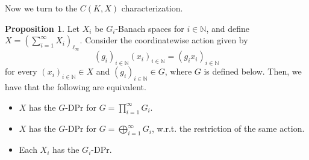 \documentclass[a4paper,12pt]{amsart}
\theoremstyle{definition}
\newtheorem{proposition}[theorem]{Proposition}
\theoremstyle{definition}
\theoremstyle{remark}
\numberwithin{equation}{section}
\newcommand{\N}{\mathbb{N}}
\newcommand{\<}{\langle}
\renewcommand{\>}{\rangle}
\begin{document}
	
	Now we turn to the $C(K, X)$ characterization.
	
	\begin{proposition} \label{prop:ellInftySumStability}
		Let $X_i$ be $G_i$-Banach spaces for $i \in \N$, and define $X = \left(\sum_{i=1}^{\infty} X_i\right)_{\ell_\infty}$. Consider the coordinatewise action given by
		\begin{equation*}
			(g_i)_{i \in \N}(x_i)_{i \in \N} = (g_i x_i)_{i \in \N}
		\end{equation*}
		for every $(x_i)_{i \in \N} \in X$ and $(g_i)_{i \in \N} \in G$, where $G$ is defined below. Then, we have that the following are equivalent.
		\begin{itemize}
			\item[(a)] $X$ has the $G$-DPr for $G = \prod_{i=1}^{\infty} G_i$.
			\item[(b)] $X$ has the $G$-DPr for $G = \bigoplus_{i=1}^{\infty} G_i$, w.r.t. the restriction of the same action.
			\item[(c)] Each $X_i$ has the $G_i$-DPr.
		\end{itemize}
	\end{proposition}
	
\end{document}
